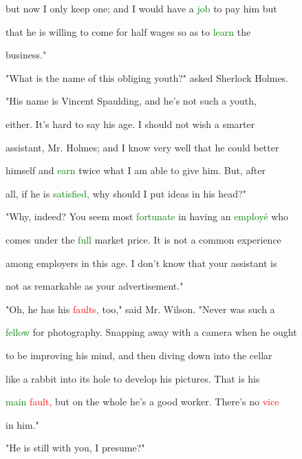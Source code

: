  but now I only keep one; and I would have a \textcolor{green}{job} to \textcolor{BurntOrange}{pay} him but

 that he is willing to come for half wages so as to \textcolor{green}{learn} the

 business."



 "What is the name of this \textcolor{BurntOrange}{obliging} \textcolor{BurntOrange}{youth?"} asked Sherlock Holmes.



 "His name is Vincent Spaulding, and he's not such a \textcolor{BurntOrange}{youth,}

 either. It's hard to say his age. I should not wish a smarter

 assistant, Mr. Holmes; and I know very well that he could better

 himself and \textcolor{green}{earn} twice what I am able to give him. But, after

 all, if he is \textcolor{green}{satisfied,} why should I put ideas in his head?"



 "Why, indeed? You seem most \textcolor{green}{fortunate} in having an \textcolor{green}{employé} who

 comes under the \textcolor{green}{full} market price. It is not a common experience

 among employers in this age. I don't know that your assistant is

 not as \textcolor{BurntOrange}{remarkable} as your advertisement."



 "Oh, he has his \textcolor{red}{faults,} too," said Mr. Wilson. "Never was such a

 \textcolor{green}{fellow} for photography. Snapping away with a camera when he ought

 to be \textcolor{BurntOrange}{improving} his mind, and then diving down into the cellar

 like a rabbit into its hole to \textcolor{BurntOrange}{develop} his pictures. That is his

 \textcolor{green}{main} \textcolor{red}{fault,} but on the whole he's a \textcolor{BurntOrange}{good} worker. There's no \textcolor{red}{vice}

 in him."



 "He is still with you, I presume?"



